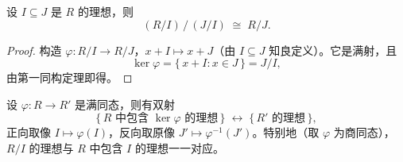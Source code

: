 \begin{theorem}[第三同构定理]
设 $I\subseteq J$ 是 $R$ 的理想，则
\[
  (R/I)\,\big/\,(J/I) \;\cong\; R/J.
\]
\end{theorem}

\begin{proof}
构造 $\varphi\colon R/I\to R/J$，$x + I\mapsto x + J$（由
$I\subseteq J$ 知良定义）。它是满射，且
\[
  \ker\varphi = \{\,x + I : x\in J\,\} = J/I,
\]
由第一同构定理即得。
\end{proof}

\begin{theorem}[对应定理]
设 $\varphi\colon R\to R'$ 是满同态，则有双射
\[
  \{\,R\text{ 中包含 }\ker\varphi\text{ 的理想}\,\}
  \;\longleftrightarrow\;
  \{\,R'\text{ 的理想}\,\},
\]
正向取像 $I\mapsto\varphi(I)$，反向取原像
$J'\mapsto\varphi^{-1}(J')$。特别地（取 $\varphi$ 为商同态），$R/I$
的理想与 $R$ 中包含 $I$ 的理想一一对应。
\end{theorem}
